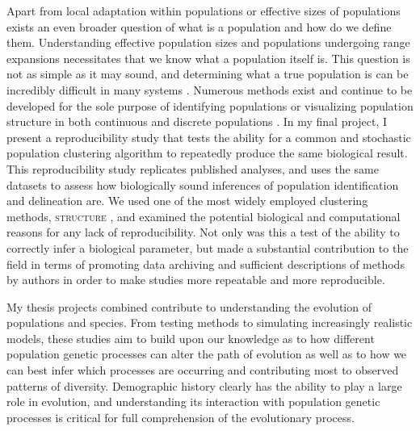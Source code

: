 Apart from local adaptation within populations or effective sizes of populations exists an even broader question of what is a population and how do we define them. Understanding effective population sizes and populations undergoing range expansions necessitates that we know what a population itself is. This question is not as simple as it may sound, and determining what a true population is can be incredibly difficult in many systems \citep{Waples:2006}. Numerous methods exist and continue to be developed for the sole purpose of identifying populations or visualizing population structure in both continuous and discrete populations \citep{Pritchard:2000, Falush:2003, Falush:2007, Rosenberg:2004, Petkova:2015, Bradburd:2016}. In my final project,  I present a reproducibility study that tests the ability for a common and stochastic population clustering algorithm to repeatedly produce the same biological result. This reproducibility study replicates published analyses, and uses the same datasets to assess how biologically sound inferences of population identification and delineation are. We used one of the most widely employed clustering methods, \textsc{structure} \citep{Pritchard:2000}, and examined the potential biological and computational reasons for any lack of reproducibility. Not only was this a test of the ability to correctly infer a biological parameter, but made a substantial contribution to the field in terms of promoting data archiving and sufficient descriptions of methods by authors in order to make studies more repeatable and more reproducible. 



My thesis projects combined contribute to understanding the evolution of populations and species. From testing methods to simulating increasingly realistic models, these studies aim to build upon our knowledge as to how different population genetic processes can alter the path of evolution as well as to how we can best infer which processes are occurring and contributing most to observed patterns of diversity. Demographic history clearly has the ability to play a large role in evolution, and understanding its interaction with population genetic processes is critical for full comprehension of the evolutionary process.









